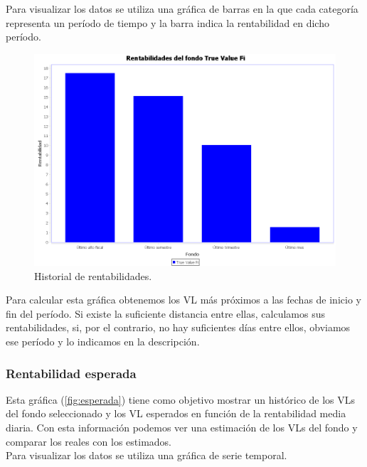 \documentclass[12pt, a4paper]{book}
\begin{document}
Para visualizar los datos se utiliza una gráfica de barras en la que cada categoría representa un período de tiempo y la barra indica la rentabilidad en dicho período.

	\begin{figure}[htbp]
	\centering
	\includegraphics[width=\textwidth]{figuras/rentabilidades.PNG}
	\caption{Historial de rentabilidades.}
	\label{fig:rentabilidades}
	\end {figure}

Para calcular esta gráfica obtenemos los \gls{VL} más próximos a las fechas de inicio y fin del período. Si existe la suficiente distancia entre ellas, calculamos sus rentabilidades, si, por el contrario, no hay suficientes días entre ellos, obviamos ese período y lo indicamos en la descripción.

\newpage

\subsubsection{Rentabilidad esperada}

Esta gráfica (\ref{fig:esperada}) tiene como objetivo mostrar un histórico de los \gls{VL}s del fondo seleccionado y los \gls{VL} esperados en función de la rentabilidad media diaria. Con esta información podemos ver una estimación de los \gls{VL}s del fondo y comparar los reales con los estimados.\\

Para visualizar los datos se utiliza una gráfica de serie temporal.
\end{document}
